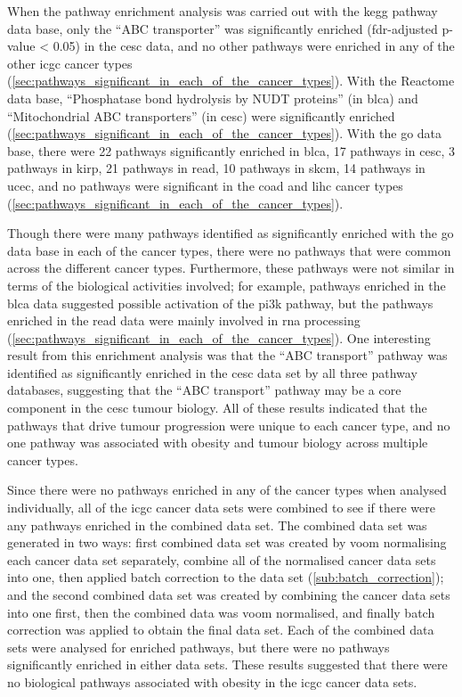 When the pathway enrichment analysis was carried out with the \gls{kegg} pathway data base, only the ``ABC transporter'' was significantly enriched (\gls{fdr}-adjusted p-value \textless{} 0.05) in the \gls{cesc} data, and no other pathways were enriched in any of the other \gls{icgc} cancer types (\cref{sec:pathways_significant_in_each_of_the_cancer_types}).
With the Reactome data base, ``Phosphatase bond hydrolysis by NUDT proteins'' (in \gls{blca}) and ``Mitochondrial ABC transporters'' (in \gls{cesc}) were significantly enriched (\cref{sec:pathways_significant_in_each_of_the_cancer_types}).
With the \gls{go} data base, there were 22 pathways significantly enriched in \gls{blca}, 17 pathways in \gls{cesc}, 3 pathways in \gls{kirp}, 21 pathways in \gls{read}, 10 pathways in \gls{skcm}, 14 pathways in \gls{ucec}, and no pathways were significant in the \gls{coad} and \gls{lihc} cancer types (\cref{sec:pathways_significant_in_each_of_the_cancer_types}).

Though there were many pathways identified as significantly enriched with the \gls{go} data base in each of the cancer types, there were no pathways that were common across the different cancer types.
Furthermore, these pathways were not similar in terms of the biological activities involved; for example, pathways enriched in the \gls{blca} data suggested possible activation of the \gls{pi3k} pathway, but the pathways enriched in the \gls{read} data were mainly involved in \acrshort{rna} processing (\cref{sec:pathways_significant_in_each_of_the_cancer_types}).
One interesting result from this enrichment analysis was that the ``ABC transport'' pathway was identified as significantly enriched in the \gls{cesc} data set by all three pathway databases, suggesting that the ``ABC transport'' pathway may be a core component in the \gls{cesc} tumour biology.
All of these results indicated that the pathways that drive tumour progression were unique to each cancer type, and no one pathway was associated with obesity and tumour biology across multiple cancer types.

Since there were no pathways enriched in any of the cancer types when analysed individually, all of the \gls{icgc} cancer data sets were combined to see if there were any pathways enriched in the combined data set.
The combined data set was generated in two ways: first combined data set was created by voom normalising each cancer data set separately, combine all of the normalised cancer data sets into one, then applied batch correction to the data set (\cref{sub:batch_correction}); and the second combined data set was created by combining the cancer data sets into one first, then the combined data was voom normalised, and finally batch correction was applied to obtain the final data set.
Each of the combined data sets were analysed for enriched pathways, but there were no pathways significantly enriched in either data sets.
These results suggested that there were no biological pathways associated with obesity in the \gls{icgc} cancer data sets.

